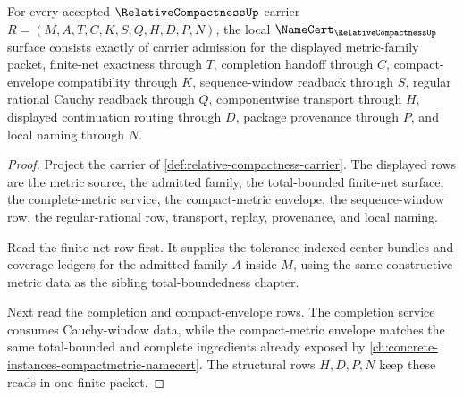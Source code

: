 \begin{theorem}
\label{thm:relative-compactness-namecert-obligations}
For every accepted $\RelativeCompactnessUp$ carrier $R=(M,A,T,C,K,S,Q,H,D,P,N)$, the local $\NameCert_{\RelativeCompactnessUp}$ surface consists exactly of carrier admission for the displayed metric-family packet, finite-net exactness through $T$, completion handoff through $C$, compact-envelope compatibility through $K$, sequence-window readback through $S$, regular rational Cauchy readback through $Q$, componentwise transport through $H$, displayed continuation routing through $D$, package provenance through $P$, and local naming through $N$.
\end{theorem}
\begin{proof}
Project the carrier of \autoref{def:relative-compactness-carrier}. The displayed rows are the metric source, the admitted family, the total-bounded finite-net surface, the complete-metric service, the compact-metric envelope, the sequence-window row, the regular-rational row, transport, replay, provenance, and local naming.

Read the finite-net row first. It supplies the tolerance-indexed center bundles and coverage ledgers for the admitted family $A$ inside $M$, using the same constructive metric data as the sibling total-boundedness chapter.

Next read the completion and compact-envelope rows. The completion service consumes Cauchy-window data, while the compact-metric envelope matches the same total-bounded and complete ingredients already exposed by \autoref{ch:concrete-instances-compactmetric-namecert}. The structural rows $H,D,P,N$ keep these reads in one finite packet.
\end{proof}

